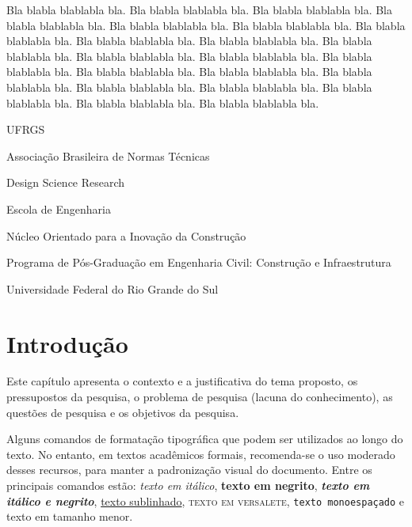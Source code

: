 \documentclass[diss,capa,times,english]{ppgci}
\begin{document}
\begin{englishabstract}
Bla blabla blablabla bla.  Bla blabla blablabla bla.  Bla blabla
blablabla bla.  Bla blabla blablabla bla.  Bla blabla blablabla bla.
Bla blabla blablabla bla.  Bla blabla blablabla bla.  Bla blabla
blablabla bla.  Bla blabla blablabla bla.  Bla blabla blablabla bla.
Bla blabla blablabla bla.  Bla blabla blablabla bla.  Bla blabla
blablabla bla.  Bla blabla blablabla bla.  Bla blabla blablabla bla.
Bla blabla blablabla bla.  Bla blabla blablabla bla.  Bla blabla
blablabla bla.  Bla blabla blablabla bla.  Bla blabla blablabla bla.
Bla blabla blablabla bla.
\end{englishabstract}

\listoffigures

\listoftables

\listofquadros %

\begin{listofabbrv}{UFRGS}%
    \item[ABNT] Associação Brasileira de Normas Técnicas
    \item[DSR] Design Science Research
    \item[EE] Escola de Engenharia
    \item[NORIE] Núcleo Orientado para a Inovação da Construção
    \item[PPGCI] Programa de Pós-Graduação em Engenharia Civil: Construção e Infraestrutura
    \item[UFRGS] Universidade Federal do Rio Grande do Sul
\end{listofabbrv}

\tableofcontents

\chapter{Introdução} %
Este capítulo apresenta o contexto e a justificativa do tema proposto, os pressupostos da pesquisa, o problema de pesquisa (lacuna do conhecimento), as questões de pesquisa e os objetivos da pesquisa.

Alguns comandos de formatação tipográfica que podem ser utilizados ao longo do texto. No entanto, em textos acadêmicos formais, recomenda-se o uso moderado desses recursos, para manter a padronização visual do documento. Entre os principais comandos estão: \emph{texto em itálico}, \textbf{texto em negrito}, \textbf{\emph{texto em itálico e negrito}}, \underline{texto sublinhado}, \textsc{texto em versalete}, \texttt{texto monoespaçado} e \small{texto em tamanho menor}.
\end{document}
